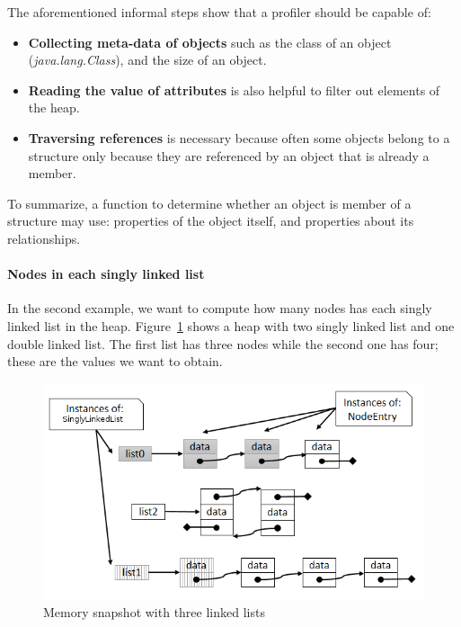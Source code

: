 The aforementioned informal steps show that a profiler should be capable of:

\begin{itemize}
\item \textbf{Collecting meta-data of objects} such as the class of an object (\textit{java.lang.Class}), and the size of an object. 

\item \textbf{Reading the value of attributes} is also helpful to filter out elements of the heap.

\item \textbf{Traversing references} is necessary because often some objects belong to a structure only because they are referenced by an object that is already a member.
\end{itemize}

To summarize, a function to determine whether an object is member of a structure may use: properties of the object itself, and properties about its relationships.



\paragraph{Nodes in each singly linked list}

In the second example, we want to compute how many nodes has each singly linked list in the heap.
Figure~\ref{fig:simple_snapshot} shows a heap with two singly linked list and one double linked list.
The first list has three nodes while the second one has four; these are the values we want to obtain.


\begin{figure}[!ht]
\centering
\includegraphics[width=0.65\linewidth]{chapter6/fig/lists}
\caption{Memory snapshot with three linked lists}
\label{fig:simple_snapshot}
\end{figure}


